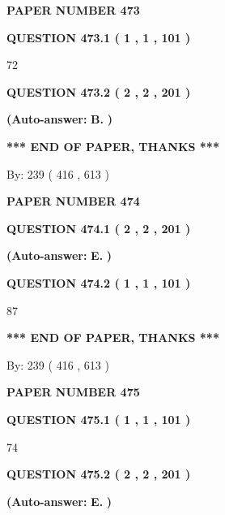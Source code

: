 \documentclass{ctexart}
\begin{document}
   
 {\textbf{ \Large{ PAPER NUMBER  473  }}}
   
   
   
   
  
  
{\textbf{\large{QUESTION
473.1 
 ( 1 , 1 , 101 )
}}}

72
  
  
{\textbf{\large{QUESTION
473.2 
 ( 2 , 2 , 201 )
}}}
 
 
{\textbf{(Auto-answer:}}
{\textbf{\large{
B.}}}
{\textbf{)}}
 
 
   
   
   
   
\vspace{1.0in} 
{\textbf{\large{ *** END OF PAPER, THANKS *** }}} 
   
   
\hspace{1.0in} By: 
 239 ( 416 ,  613 )
   
   
   
   
\newpage 
\setcounter{page}{ 
   474001 } 
   
   
 {\textbf{ \Large{ PAPER NUMBER  474  }}}
   
   
   
   
  
  
{\textbf{\large{QUESTION
474.1 
 ( 2 , 2 , 201 )
}}}
 
 
{\textbf{(Auto-answer:}}
{\textbf{\large{
E.}}}
{\textbf{)}}
 
 
  
  
{\textbf{\large{QUESTION
474.2 
 ( 1 , 1 , 101 )
}}}

87
   
   
   
   
\vspace{1.0in} 
{\textbf{\large{ *** END OF PAPER, THANKS *** }}} 
   
   
\hspace{1.0in} By: 
 239 ( 416 ,  613 )
   
   
   
   
\newpage 
\setcounter{page}{ 
   475001 } 
   
   
 {\textbf{ \Large{ PAPER NUMBER  475  }}}
   
   
   
   
  
  
{\textbf{\large{QUESTION
475.1 
 ( 1 , 1 , 101 )
}}}

74
  
  
{\textbf{\large{QUESTION
475.2 
 ( 2 , 2 , 201 )
}}}
 
 
{\textbf{(Auto-answer:}}
{\textbf{\large{
E.}}}
{\textbf{)}}
 
\end{document}
